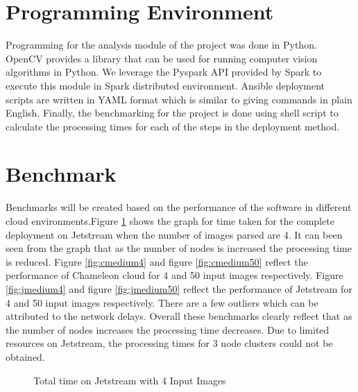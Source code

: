 \documentclass[9pt,twocolumn,twoside]{../../styles/osajnl}
\begin{document}
\section{Programming Environment}
Programming for the analysis module of the project was done in
Python. OpenCV provides a library that can be used for running
computer vision algorithms in Python. We leverage the Pyspark API
provided by Spark to execute this module in Spark distributed
environment. Ansible deployment scripts are written in YAML format
which is similar to giving commands in plain English. Finally, the
benchmarking for the project is done using shell script to calculate
the processing times for each of the steps in the deployment method.

\section{Benchmark}
Benchmarks will be created based on the performance of the software in
different cloud environments.Figure \ref{fig:jmedium} shows the graph for
time taken for the complete deployment on Jetstream when the number of
images parsed are 4. It can been seen from the graph that as the
number of nodes is increased the processing time is
reduced. Figure \ref{fig:cmedium4} and figure \ref{fig:cmedium50} reflect the
performance of Chameleon cloud for 4 and 50 input images
respectively. Figure \ref{fig:jmedium4} and figure \ref{fig:jmedium50} reflect the
performance of Jetstream for 4 and 50 input images respectively. There
are a few outliers which can be attributed to the network
delays. Overall these benchmarks clearly reflect that as the number of
nodes increases the processing time decreases. Due to limited
resources on Jetstream, the processing times for 3 node clusters could
not be obtained.

\begin{figure}[htbp]
\centering
{}
\caption{Total time on Jetstream with 4 Input Images}
\label{fig:jmedium}
\end{figure}
\end{document}
